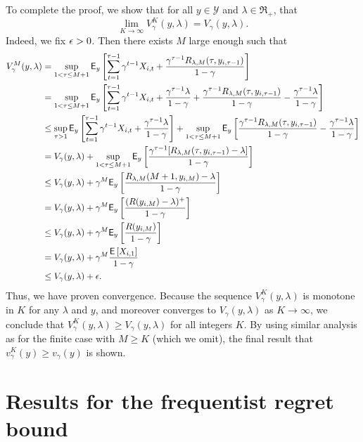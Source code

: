 \begin{myproof}[Proof.]
	To complete the proof, we show that for all $y \in \mathcal{Y}$ and $\lambda \in \Re_+$, that 
	\[
	\lim_{K \to \infty}V^K_\gamma(y, \lambda) = V_\gamma(y, \lambda).
	\]
	Indeed, we fix $\epsilon > 0$. Then there exists $M$ large enough such that
	\begin{align*}
		V^M_\gamma(y, \lambda) & = \sup_{1 < \tau \le M+1} \mathsf{E}_y\left[\sum_{t=1}^{\tau - 1} \gamma^{t-1} X_{i,t} + \frac{\gamma^{\tau-1}R_{\lambda,M}(\tau, y_{i,\tau-1})}{1-\gamma}\right] \\
		& = \sup_{1 < \tau \le M+1} \mathsf{E}_y\left[\sum_{t=1}^{\tau - 1} \gamma^{t-1} X_{i,t} + \frac{\gamma^{\tau -1}\lambda}{1-\gamma} + \frac{\gamma^{\tau-1}R_{\lambda,M}(\tau, y_{i,\tau-1})}{1-\gamma} - \frac{\gamma^{\tau -1}\lambda}{1-\gamma}\right] \\
		& \le \sup_{\tau > 1} \mathsf{E}_y\left[\sum_{t=1}^{\tau - 1} \gamma^{t-1} X_{i,t} + \frac{\gamma^{\tau -1}\lambda}{1-\gamma}\right] + \sup_{1 < \tau \le M + 1}\mathsf{E}_y\left[\frac{\gamma^{\tau-1}R_{\lambda,M}(\tau, y_{i,\tau-1})}{1-\gamma} - \frac{\gamma^{\tau -1}\lambda}{1-\gamma}\right] \\
		& =V_{\gamma}(y, \lambda) + \sup_{1 < \tau \le M + 1}\mathsf{E}_y\left[\frac{\gamma^{\tau-1}[R_{\lambda,M}(\tau, y_{i,\tau-1})-\lambda]}{1-\gamma}\right] \\
		& \le V_{\gamma}(y, \lambda)  + \gamma^{M}\mathsf{E}_y\left[\frac{R_{\lambda,M}(M+1, y_{i,M})-\lambda}{1-\gamma}\right] \\
		& = V_{\gamma}(y, \lambda)  + \gamma^{M}\mathsf{E}_y\left[\frac{( R(y_{i,M}) - \lambda)^+}{1-\gamma}\right] \\
		& \le V_{\gamma}(y, \lambda)  + \gamma^{M}\mathsf{E}_y\left[\frac{R(y_{i,M})}{1-\gamma}\right]  \\
		& = V_{\gamma}(y, \lambda)  + \gamma^M \frac{\mathsf{E} \left[ X_{i,1} \right]}{1-\gamma} \\
		& \le V_{\gamma}(y, \lambda)  + \epsilon.
	\end{align*}
	Thus, we have proven convergence. Because the sequence $V^K_\gamma(y, \lambda)$ is monotone in $K$ for any $\lambda$ and $y$, and moreover converges to $V_\gamma(y, \lambda)$ as $K \to \infty$, we conclude that $V^K_\gamma(y, \lambda) \ge V_\gamma(y, \lambda)$ for all integers $K$. By using similar analysis as for the finite case with $M \ge K$ (which we omit), the final result that $v^K_\gamma(y) \ge v_\gamma(y)$ is shown.
\end{myproof}

\section{Results for the frequentist regret bound}
